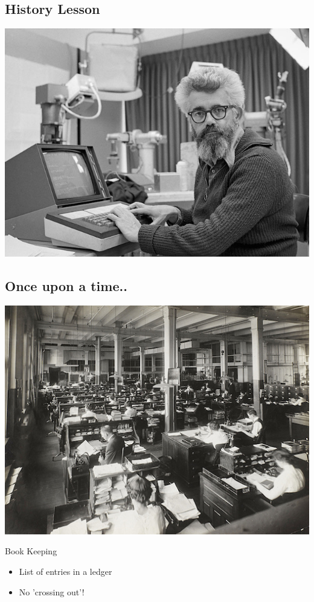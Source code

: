 \documentclass[11pt]{article}
\begin{document}
\subsection*{History Lesson}
\label{sec:orgheadline4}

\includegraphics[width=.9\linewidth]{./John-McCarthy.jpg}

\subsection*{Once upon a time..}
\label{sec:orgheadline8}

\includegraphics[width=.9\linewidth]{./book-keepers.jpg}

Book Keeping
\begin{itemize}
\item List of entries in a ledger
\end{itemize}
\begin{itemize}
\item No 'crossing out'!
\end{itemize}
\end{document}
